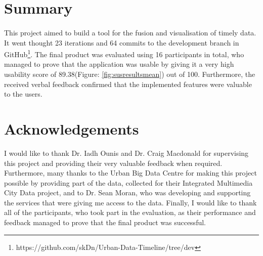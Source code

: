 \documentclass{l4proj}
\begin{document}
\section{Summary}
\paragraph{}
This project aimed to build a tool for the fusion and visualisation of timely data. It went thought 23 iterations and 64 commits to the development branch in GitHub\footnote{https://github.com/skDn/Urban-Data-Timeline/tree/dev}. The final product was evaluated using 16 participants in total, who managed to prove that the application was usable by giving it a very high usability score of 89.38(Figure: \ref{fig:susresultsmean}) out of 100. Furthermore, the received verbal feedback confirmed that the implemented features were valuable to the users. 

\section{Acknowledgements}
I would like to thank Dr. Iadh Ounis and Dr. Craig Macdonald for supervising this project and providing their very valuable feedback when required. Furthermore, many thanks to the Urban Big Data Centre for making this project possible by providing part of the data, collected for their Integrated Multimedia City Data project, and to Dr. Sean Moran, who was developing and supporting the services that were giving me access to the data. Finally, I would like to thank all of the participants, who took part in the evaluation, as their performance and feedback managed to prove that the final product was successful.  
\end{document}
